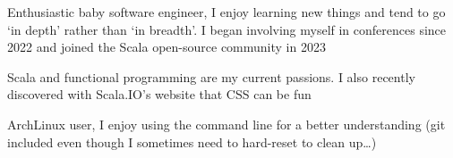 \begin{MainPart}
  \color{Black}
  \vspace{0.25cm}
  {
    \vspace{-\baselineskip}
    \begin{flushleft}
      Enthusiastic baby software engineer, I enjoy learning new things and tend to go `in depth' rather than `in breadth'. I began involving myself in conferences since 2022 and joined the Scala open-source community in 2023

      \vspace{\baselineskip}
      Scala and functional programming are my current passions. I also recently discovered with Scala.IO's website that CSS can be fun

      \vspace{\baselineskip}
      ArchLinux user, I enjoy using the command line for a better understanding (git included even though I sometimes need to hard-reset to clean up\dots)
    \end{flushleft}
  }


  \vspace{0.3cm}


\end{MainPart}

